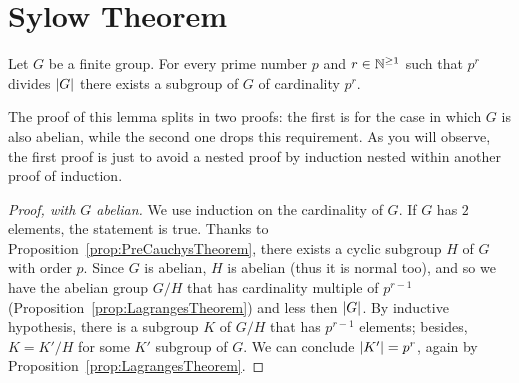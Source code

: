 
\section{Sylow Theorem}

\begin{proposition}\label{prop:SylowTheorem1}
Let \(G\) be a finite group. For every prime number \(p\) and \(r \in \mathbb N^{\ge 1}\) such that \(p^r\) divides \(\left\lvert G\right\rvert\) there exists a subgroup of \(G\) of cardinality \(p^r\).
\end{proposition}

The proof of this lemma splits in two proofs: the first is for the case in which \(G\) is also abelian, while the second one drops this requirement. As you will observe, the first proof is just to avoid a nested proof by induction nested within another proof of induction. 

\begin{proof}[Proof, with \(G\) abelian] We use induction on the cardinality of \(G\). If \(G\) has \(2\) elements, the statement is true. Thanks to Proposition~\ref{prop:PreCauchysTheorem}, there exists a cyclic subgroup \(H\) of \(G\) with order \(p\). Since \(G\) is abelian, \(H\) is abelian (thus it is normal too), and so we have the abelian group \(G/H\) that has cardinality multiple of \(p^{r-1}\) (Proposition~\ref{prop:LagrangesTheorem}) and less then \(\left\lvert G\right\rvert\). By inductive hypothesis, there is a subgroup \(K\) of \(G/H\) that has \(p^{r-1}\) elements; besides, \(K = K'/H\) for some \(K'\) subgroup of \(G\). We can conclude \(\left\lvert K'\right\rvert = p^{r}\), again by Proposition~\ref{prop:LagrangesTheorem}.
\end{proof}

